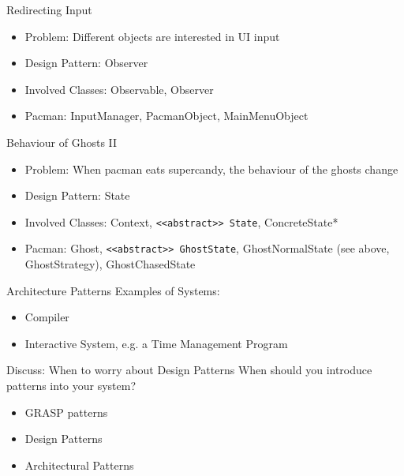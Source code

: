 \documentclass[10pt,t,a4paper]{beamer}
\begin{document}
\begin{frame}[label=sec-1-10]{Redirecting Input}
\begin{itemize}
\item Problem: Different objects are interested in UI input
\item Design Pattern: Observer
\item Involved Classes: Observable, Observer
\item Pacman: InputManager, PacmanObject, MainMenuObject
\end{itemize}
\end{frame}
\begin{frame}[fragile,label=sec-1-11]{Behaviour of Ghosts II}
 \begin{itemize}
\item Problem: When pacman eats supercandy, the behaviour of the ghosts change
\item Design Pattern: State
\item Involved Classes: Context, \texttt{<<abstract>> State}, ConcreteState*
\item Pacman: Ghost, \texttt{<<abstract>> GhostState}, GhostNormalState (see above, GhostStrategy), GhostChasedState
\end{itemize}
\end{frame}
\begin{frame}[label=sec-1-12]{Architecture Patterns}
Examples of Systems:

\begin{itemize}
\item Compiler
\item Interactive System, e.g. a Time Management Program
\end{itemize}

\end{frame}
\begin{frame}[label=sec-1-13]{Discuss: When to worry about Design Patterns}
When should you introduce patterns into your system?
\begin{itemize}
\item GRASP patterns
\item Design Patterns
\item Architectural Patterns
\end{itemize}
\end{frame}
\end{document}
